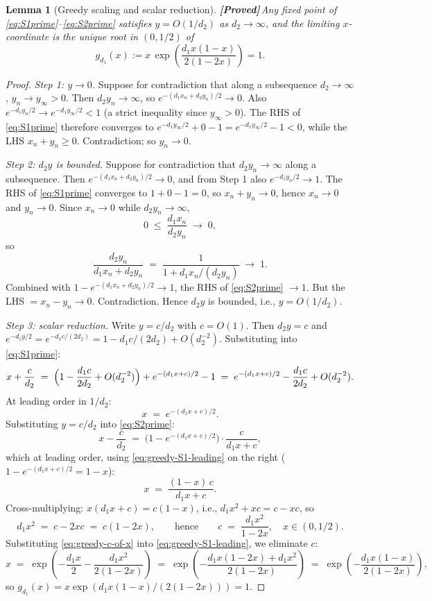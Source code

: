 \documentclass{article}
\theoremstyle{plain}
\newtheorem{lemma}{Lemma}
\theoremstyle{definition}
\newcommand{\proved}{\textcolor{provedgreen}{\textbf{[Proved]}}\,}
\begin{document}
\begin{lemma}[Greedy scaling and scalar reduction]\label{lem:greedy-scalar}
\proved Any fixed point of \eqref{eq:S1prime}--\eqref{eq:S2prime} satisfies $y=O(1/d_2)$ as $d_2\to\infty$, and the limiting $x$-coordinate is the unique root in $(0,1/2)$ of
\[
g_{d_1}(x):=x\,\exp\!\left(\frac{d_1 x(1-x)}{2(1-2x)}\right)=1.
\]
\end{lemma}

\begin{proof}
\emph{Step 1: $y\to 0$.} Suppose for contradiction that along a subsequence $d_2\to\infty$, $y_n\to y_\infty>0$. Then $d_2 y_n\to\infty$, so $e^{-(d_1 x_n+d_2 y_n)/2}\to 0$. Also $e^{-d_1 y_n/2}\to e^{-d_1 y_\infty/2}<1$ (a strict inequality since $y_\infty>0$). The RHS of \eqref{eq:S1prime} therefore converges to $e^{-d_1 y_\infty/2}+0-1=e^{-d_1 y_\infty/2}-1<0$, while the LHS $x_n+y_n\ge 0$. Contradiction; so $y_n\to 0$.

\emph{Step 2: $d_2 y$ is bounded.} Suppose for contradiction that $d_2 y_n\to\infty$ along a subsequence. Then $e^{-(d_1 x_n+d_2 y_n)/2}\to 0$, and from Step 1 also $e^{-d_1 y_n/2}\to 1$. The RHS of \eqref{eq:S1prime} converges to $1+0-1=0$, so $x_n+y_n\to 0$, hence $x_n\to 0$ and $y_n\to 0$. Since $x_n\to 0$ while $d_2 y_n\to\infty$,
\[
0\;\le\;\frac{d_1 x_n}{d_2 y_n}\;\to\;0,
\]
so
\[
\frac{d_2 y_n}{d_1 x_n+d_2 y_n}\;=\;\frac{1}{1+d_1 x_n/(d_2 y_n)}\;\to\;1.
\]
Combined with $1-e^{-(d_1 x_n+d_2 y_n)/2}\to 1$, the RHS of \eqref{eq:S2prime} $\to 1$. But the LHS $=x_n-y_n\to 0$. Contradiction. Hence $d_2 y$ is bounded, i.e., $y=O(1/d_2)$.

\emph{Step 3: scalar reduction.} Write $y=c/d_2$ with $c=O(1)$. Then $d_2 y=c$ and $e^{-d_1 y/2}=e^{-d_1 c/(2 d_2)}=1-d_1 c/(2 d_2)+O(d_2^{-2})$. Substituting into \eqref{eq:S1prime}:
\[
x+\frac{c}{d_2}\;=\;\Bigl(1-\frac{d_1 c}{2 d_2}+O(d_2^{-2})\Bigr)+e^{-(d_1 x+c)/2}-1\;=\;e^{-(d_1 x+c)/2}-\frac{d_1 c}{2 d_2}+O(d_2^{-2}).
\]
At leading order in $1/d_2$:
\begin{equation}\label{eq:greedy-S1-leading}
x\;=\;e^{-(d_1 x+c)/2}.
\end{equation}
Substituting $y=c/d_2$ into \eqref{eq:S2prime}:
\[
x-\frac{c}{d_2}\;=\;\bigl(1-e^{-(d_1 x+c)/2}\bigr)\cdot\frac{c}{d_1 x+c},
\]
which at leading order, using \eqref{eq:greedy-S1-leading} on the right ($1-e^{-(d_1 x+c)/2}=1-x$):
\[
x\;=\;\frac{(1-x)\,c}{d_1 x+c}.
\]
Cross-multiplying: $x(d_1 x+c)=c(1-x)$, i.e., $d_1 x^2+xc=c-xc$, so
\begin{equation}\label{eq:greedy-c-of-x}
d_1 x^2\;=\;c-2xc\;=\;c(1-2x),\qquad\text{hence}\qquad c\;=\;\frac{d_1 x^2}{1-2x},\quad x\in(0,1/2).
\end{equation}
Substituting \eqref{eq:greedy-c-of-x} into \eqref{eq:greedy-S1-leading}, we eliminate $c$:
\[
x\;=\;\exp\!\left(-\frac{d_1 x}{2}-\frac{d_1 x^2}{2(1-2x)}\right)\;=\;\exp\!\left(-\frac{d_1 x(1-2x)+d_1 x^2}{2(1-2x)}\right)\;=\;\exp\!\left(-\frac{d_1 x(1-x)}{2(1-2x)}\right),
\]
so $g_{d_1}(x)=x\exp(d_1 x(1-x)/(2(1-2x)))=1$.


\end{proof}
\end{document}
